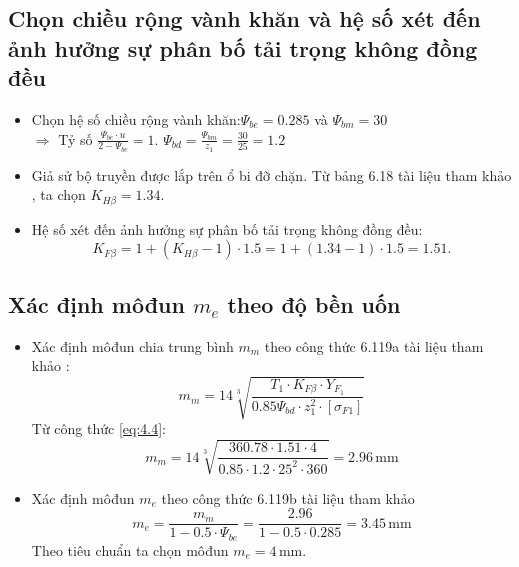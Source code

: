         \subsection{Chọn chiều rộng vành khăn và hệ số xét đến ảnh hưởng sự phân bố tải trọng không đồng đều}
            \begin{itemize}
                \item Chọn hệ số chiều rộng vành khăn:$\Psi_{be} = 0.285$ và $\Psi_{bm} = 30$\\[0.3cm]
                $\Rightarrow$ Tỷ số $\frac{\Psi_{be} \cdot u}{2 - \Psi_{be}} = 1$. $\Psi_{bd} = \frac{\Psi_{bm}}{z_1} = \frac{30}{25} = 1.2$
                \item Giả sử bộ truyền được lắp trên ổ bi đỡ chặn. Từ bảng 6.18 tài liệu tham khảo \cite{gtctm}, ta chọn $K_{H\beta} = 1.34$.
                \item Hệ số xét đến ảnh hưởng sự phân bố tải trọng không đồng đều:
                \begin{equation*}
                    K_{F\beta} = 1 + (K_{H\beta} - 1) \cdot 1.5 = 1 + (1.34 - 1) \cdot 1.5 = 1.51.
                \end{equation*}
            \end{itemize}
        \subsection{Xác định môđun $m_e$ theo độ bền uốn}
            \begin{itemize}
                \item Xác định môđun chia trung bình $m_m$ theo công thức 6.119a tài liệu tham khảo \cite{gtctm}:
                \begin{equation}
                    m_m = 14\sqrt[3]{\frac{T_1 \cdot K_{F\beta} \cdot Y_{F_1}}{0.85\Psi_{bd} \cdot z_1^2 \cdot [\sigma_{F1}]}}
                    \label{eq:4.4}
                \end{equation}
                Từ công thức \ref{eq:4.4}:
                \begin{equation*}
                    m_m = 14\sqrt[3]{\frac{360.78 \cdot 1.51 \cdot 4}{0.85 \cdot 1.2 \cdot 25^2 \cdot 360}} = 2.96 \, \mathrm{mm}
                \end{equation*}
            \item Xác định môđun $m_e$ theo công thức 6.119b tài liệu tham khảo \cite{gtctm}
                \begin{equation}
                    m_e = \frac{m_m}{1 - 0.5 \cdot \Psi_{be}} = \frac{2.96}{1 - 0.5 \cdot 0.285} = 3.45 \, \mathrm{mm}
                    \label{eq:4.5}
                \end{equation}
                Theo tiêu chuẩn ta chọn môđun $m_e = 4 \, \mathrm{mm}$.
            \end{itemize}
